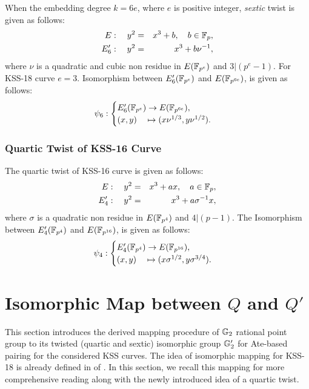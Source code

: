 When the embedding degree $k = 6e$, where $e$ is positive integer, \textit{sextic} twist  is given as follows:
\begin{eqnarray}
E:  \quad y^2 & = & x^3+b, \quad b \in {\mathbb{F}}_{p}, \\
E'_6: \quad y^2 & =  & x^3+b\nu^{-1},
\end{eqnarray}  
where $\nu$ is a quadratic and cubic non residue in $E({\mathbb{F}}_{p^{e}})$ and $3|(p^e-1)$.  For KSS-18 curve $e=3$. Isomorphism between $E'_6({\mathbb{F}}_{p^{e}})$ and $E({\mathbb{F}}_{p^{6e}})$, is given as follows:
\begin{eqnarray}
\psi_6 : \begin{cases}
E'_6({\mathbb{F}}_{p^{e}}) \rightarrow E({\mathbb{F}}_{p^{6e}}),\\
(x,y) \quad \mapsto (x\nu^{1/3},y\nu^{1/2}).
\end{cases}
\end{eqnarray}


\subsubsection{Quartic Twist of KSS-16 Curve} 
\label{sec:ch:ijnc:kss16twist}
The quartic twist of KSS-16 curve is given as  follows:
\begin{eqnarray}
E:  \quad y^2 & = & x^3+ax, \quad a \in {\mathbb{F}}_{p}, \\
E'_4: \quad y^2 & =  & x^3+a\sigma^{-1}x,
\end{eqnarray}  
where $\sigma$ is a quadratic non residue in $E({\mathbb{F}}_{p^{4}})$ and $4|(p-1)$.  The Isomorphism between $E'_4({\mathbb{F}}_{p^{4}})$ and $E({\mathbb{F}}_{p^{16}})$, is given as follows:
\begin{eqnarray}
\psi_4 : \begin{cases}
E'_4({\mathbb{F}}_{p^{4}}) \rightarrow E({\mathbb{F}}_{p^{16}}),\\
(x,y) \quad \mapsto (x\sigma^{1/2},y\sigma^{3/4}).
\end{cases}
\end{eqnarray}

\section{Isomorphic Map between \texorpdfstring{$Q$}{Q} and \texorpdfstring{$Q'$}{Q'}}
This section introduces the derived mapping procedure of ${\mathbb{G}}_{2}$ rational point group to its twisted (quartic and sextic) isomorphic group ${\mathbb{G}}_{2}'$ for Ate-based pairing for the considered KSS curves. 
The idea of isomorphic mapping for KSS-18  is already defined in   of . 
In this section, we recall this mapping for more comprehensive reading along with the newly introduced idea of a quartic twist.

